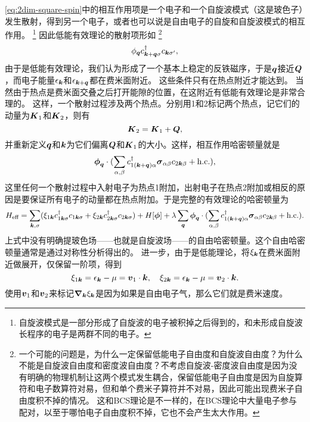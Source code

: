 \eqref{eq:2dim-square-spin}中的相互作用项是一个电子和一个自旋波模式（这是玻色子）发生散射，得到另一个电子，或者也可以说是自由电子的自旋和自旋波模式的相互作用。%
\footnote{自旋波模式是一部分形成了自旋波的电子被积掉之后得到的，和未形成自旋波长程序的电子是两群不同的电子。}%
因此低能有效理论的散射项形如%
\footnote{一个可能的问题是，为什么一定保留低能电子自由度和自旋波自由度？为什么不能是自旋波自由度和密度波自由度？不考虑自旋波-密度波自由度是因为没有明确的物理机制让这两个模式发生耦合，保留低能电子自由度是因为自旋算符和电子数算符对易，但和单个费米子算符并不对易，因此可能出现费米子自由度积不掉的情况。
这和BCS理论是不一样的，在BCS理论中大量电子参与配对，以至于哪怕电子自由度积不掉，它也不会产生太大作用。}%
\[
    {\phi}_{\vb*{q}} {c}^\dagger_{\vb*{k}+\vb*{q}\sigma} {c}_{\vb*{k}\sigma'},
\]
由于是低能有效理论，我们认为形成了一个基本上稳定的反铁磁序，于是$\vb*{q}$接近$\vb*{Q}$，而电子能量$\epsilon_{\vb*{k}}$和$\epsilon_{\vb*{k}+\vb*{q}}$都在费米面附近。
这些条件只有在热点附近才能达到。
当然由于热点是费米面交叠之后打开能隙的位置，在这附近有低能有效理论是非常合理的。
这样，一个散射过程涉及两个热点。分别用1和2标记两个热点，记它们的动量为$\vb*{K}_1$和$\vb*{K}_2$，则有
\[
    \vb*{K}_2 = \vb*{K}_1 + \vb*{Q},
\]
并重新定义$\vb*{q}$和$\vb*{k}$为它们偏离$\vb*{Q}$和$\vb*{K}_1$的大小。这样，相互作用哈密顿量就是
\[
    {\vb*{\phi}}_{\vb*{q}} \cdot (\sum_{\alpha, \beta} {c}^\dagger_{1(\vb*{k} + \vb*{q})\alpha} \vb*{\sigma}_{\alpha \beta} {c}_{2\vb*{k} \beta} + \text{h.c.}),
\]
这里任何一个散射过程中入射电子为热点1附加，出射电子在热点2附加或相反的原因是要保证所有电子的动量都在热点附加。于是完整的有效理论的哈密顿量为
\begin{equation}
    {H}_\text{eff} = \sum_{\vb*{k}, \sigma} (\xi_{1\vb*{k}} {c}^\dagger_{1\vb*{k} \sigma} {c}_{1 \vb*{k} \sigma} + \xi_{2\vb*{k}} {c}^\dagger_{2\vb*{k} \sigma} {c}_{2 \vb*{k} \sigma}) + {H}[\vb*{\phi}] + \lambda \sum_{\vb*{q}} {\vb*{\phi}}_{\vb*{q}} \cdot (\sum_{\alpha, \beta} {c}^\dagger_{1(\vb*{k} + \vb*{q})\alpha} \vb*{\sigma}_{\alpha \beta} {c}_{2\vb*{k} \beta} + \text{h.c.}).
    \label{eq:2dim-square-spin-eff}
\end{equation}
上式中没有明确提玻色场——也就是自旋波场——的自由哈密顿量。这个自由哈密顿量通常是通过对称性分析得出的。
进一步，由于是低能理论，将$\xi_{\vb*{k}}$在费米面附近做展开，仅保留一阶项，得到
\begin{equation}
    \xi_{1\vb*{k}} = \epsilon_{\vb*{k}} - \mu = \vb*{v}_1 \cdot \vb*{k}, \quad \xi_{2\vb*{k}} = \epsilon_{\vb*{k}} - \mu = \vb*{v}_2 \cdot \vb*{k}.
\end{equation}
使用$\vb*{v}_1$和$\vb*{v}_2$来标记$\grad_{\vb*{k}}{\xi_{\vb*{k}}}$是因为如果是自由电子气，那么它们就是费米速度。

